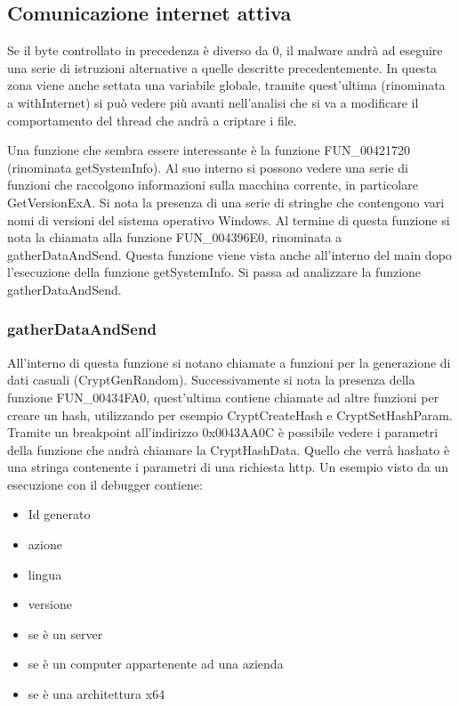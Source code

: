 \documentclass[a4paper,12pt]{article}
\begin{document}
\subsection{Comunicazione internet attiva}
Se il byte controllato in precedenza è diverso da 0, il malware andrà ad eseguire una serie di istruzioni alternative a quelle descritte precedentemente.  In questa zona viene anche settata una variabile globale, tramite quest'ultima (rinominata a withInternet) si può vedere più avanti nell'analisi che si va a modificare il comportamento del thread che andrà a criptare i file. 

Una funzione che sembra essere interessante è la funzione FUN\_00421720 (rinominata getSystemInfo). Al suo interno si possono vedere una serie di funzioni che raccolgono informazioni sulla macchina corrente, in particolare GetVersionExA. Si nota la presenza di una serie di stringhe che contengono vari nomi di versioni del sistema operativo Windows. Al termine di questa funzione si nota la chiamata alla funzione FUN\_004396E0, rinominata a gatherDataAndSend. Questa funzione viene vista anche all'interno del main dopo l'esecuzione della funzione getSystemInfo. Si passa ad analizzare la funzione gatherDataAndSend.

\subsubsection{gatherDataAndSend}
All'interno di questa funzione si notano chiamate a funzioni per la generazione di dati casuali (CryptGenRandom). Successivamente si nota la presenza della funzione FUN\_00434FA0, quest'ultima contiene chiamate ad altre funzioni per creare un hash, utilizzando per esempio CryptCreateHash e CryptSetHashParam. Tramite un breakpoint all'indirizzo 0x0043AA0C è possibile vedere i parametri della funzione che andrà chiamare la CryptHashData. Quello che verrà hashato è una stringa contenente i parametri di una richiesta http. Un esempio visto da un esecuzione con il debugger contiene:
\begin{itemize}
	\item Id generato
	\item azione
	\item lingua
	\item versione
	\item se è un server
	\item se è un computer appartenente ad una azienda
	\item se è una architettura x64
\end{itemize}
\end{document}
